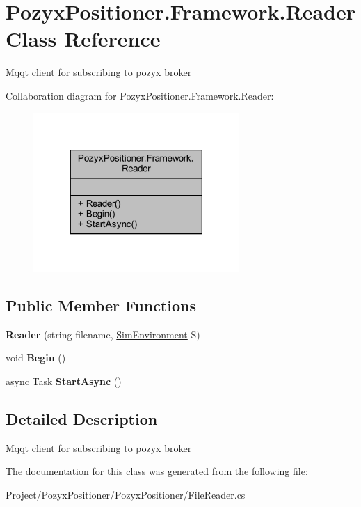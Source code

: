 \hypertarget{class_pozyx_positioner_1_1_framework_1_1_reader}{}\section{Pozyx\+Positioner.\+Framework.\+Reader Class Reference}
\label{class_pozyx_positioner_1_1_framework_1_1_reader}


Mqqt client for subscribing to pozyx broker  




Collaboration diagram for Pozyx\+Positioner.\+Framework.\+Reader\+:\nopagebreak
\begin{figure}[H]
\begin{center}
\leavevmode
\includegraphics[width=222pt]{class_pozyx_positioner_1_1_framework_1_1_reader__coll__graph}
\end{center}
\end{figure}
\subsection*{Public Member Functions}
\begin{DoxyCompactItemize}
\item 
\mbox{\label{class_pozyx_positioner_1_1_framework_1_1_reader_a75e25782cb62520a4c9dfe5b1319fdd9}} 
{\bfseries Reader} (string filename, \hyperlink{class_pozyx_positioner_1_1_framework_1_1_sim_environment}{Sim\+Environment} S)
\item 
\mbox{\label{class_pozyx_positioner_1_1_framework_1_1_reader_aec87a650a91ac217fd0e3d7aece3484a}} 
void {\bfseries Begin} ()
\item 
\mbox{\label{class_pozyx_positioner_1_1_framework_1_1_reader_aa384522a8caca942f2becd73031ac77d}} 
async Task {\bfseries Start\+Async} ()
\end{DoxyCompactItemize}


\subsection{Detailed Description}
Mqqt client for subscribing to pozyx broker 



The documentation for this class was generated from the following file\+:\begin{DoxyCompactItemize}
\item 
Project/\+Pozyx\+Positioner/\+Pozyx\+Positioner/File\+Reader.\+cs\end{DoxyCompactItemize}
